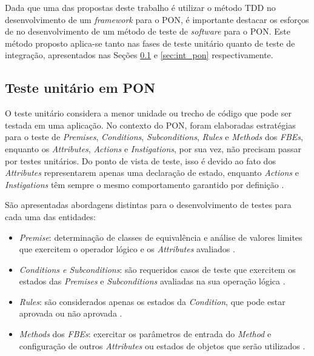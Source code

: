 Dada que uma das propostas deste trabalho é utilizar o método TDD no
desenvolvimento de um \textit{framework} para o PON, é importante destacar os
esforços de  no desenvolvimento de um método de
teste de \textit{software} para o PON. Este método proposto aplica-se tanto nas
fases de teste unitário quanto de teste de integração, apresentados nas Seções
\ref{sec:unit_pon} e \ref{sec:int_pon} respectivamente.

\subsection{Teste unitário em PON}\label{sec:unit_pon}

O teste unitário considera a menor unidade ou trecho de código que pode ser
testada em uma aplicação. No contexto do PON, foram elaboradas estratégias para
o teste de \textit{Premises}, \textit{Conditions}, \textit{Subconditions},
\textit{Rules} e \textit{Methods} dos \textit{FBEs}, enquanto os
\textit{Attributes}, \textit{Actions} e \textit{Instigations}, por sua vez, não
precisam passar por testes unitários. Do ponto de vista de teste, isso é devido
ao fato dos \textit{Attributes} representarem apenas uma declaração de estado,
enquanto \textit{Actions} e \textit{Instigations} têm sempre o mesmo
comportamento garantido por definição \cite{msc_Kossoski_2015}.

São apresentadas abordagens distintas para o desenvolvimento de testes para cada
uma das entidades:

\begin{itemize}
  \item \textit{Premise}: determinação de classes de equivalência e análise de
        valores limites que exercitem o operador lógico e os \textit{Attributes}
        avaliados \cite{msc_Kossoski_2015}.
  \item \textit{Conditions e Subconditions}: são requeridos casos de teste que
        exercitem os estados das \textit{Premises} e \textit{Subconditions}
        avaliadas na sua operação lógica \cite{msc_Kossoski_2015}.
  \item \textit{Rules}: são considerados apenas os estados da
        \textit{Condition}, que pode estar aprovada ou não aprovada
        \cite{msc_Kossoski_2015}.
  \item \textit{Methods} dos \textit{FBEs}: exercitar os parâmetros de entrada
        do \textit{Method} e configuração de outros \textit{Attributes} ou
        estados de objetos que serão utilizados \cite{msc_Kossoski_2015}.
\end{itemize}

